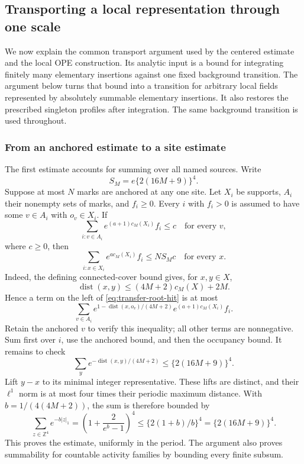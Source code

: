 \subsection{Transporting a local representation through one scale}
\label{sec:local-transfer}
We now explain the common transport argument used by the centered
estimate and the local OPE construction. Its analytic input is a
bound for integrating finitely many elementary insertions against
one fixed background transition. The argument below turns that
bound into a transition for arbitrary local fields represented by
absolutely summable elementary insertions. It also restores the
prescribed singleton profiles after integration. The same background
transition is used throughout.

\subsubsection{From an anchored estimate to a site estimate}
The first estimate accounts for summing over all named sources.
Write
\[
             S_M=e\{2(16M+9)\}^4.
\]
Suppose at most $N$ marks are anchored at any one site. Let
$X_i$ be supports, $A_i$ their nonempty sets of marks, and
$f_i\ge0$. Every $i$ with $f_i>0$ is assumed to have some
$v\in A_i$ with $o_v\in X_i$. If
\[
       \sum_{i:v\in A_i}e^{(a+1)c_M(X_i)}f_i\le c
                         \quad\text{for every }v,
\]
where $c\ge0$, then
\begin{equation}\label{eq:transfer-root-hit}
       \sum_{i:x\in X_i}e^{a c_M(X_i)}f_i\le NS_Mc
                         \quad\text{for every }x.
\end{equation}
Indeed, the defining connected-cover bound gives, for $x,y\in X$,
\[
       \operatorname{dist}(x,y)\le(4M+2)c_M(X)+2M.
\]
Hence a term on the left of \eqref{eq:transfer-root-hit} is at most
\[
 \sum_{v\in A_i}
 e^{1-\operatorname{dist}(x,o_v)/(4M+2)}
                         e^{(a+1)c_M(X_i)}f_i.
\]
Retain the anchored $v$ to verify this inequality; all other terms
are nonnegative. Sum first over $i$, use the anchored bound, and
then the occupancy bound. It remains to check
\[
 \sum_y e^{-\operatorname{dist}(x,y)/(4M+2)}
                  \le\{2(16M+9)\}^4.
\]
Lift $y-x$ to its minimal integer representative. These lifts are
distinct, and their $\ell^1$ norm is at most four times their
periodic maximum distance. With $b=1/(4(4M+2))$, the sum is
therefore bounded by
\[
 \sum_{z\in\mathbb Z^4}e^{-b|z|_1}
 =\left(1+\frac2{e^b-1}\right)^4
 \le\{2(1+b)/b\}^4=\{2(16M+9)\}^4.
\]
This proves the estimate, uniformly in the period. The argument
also proves summability for countable activity families by bounding
every finite subsum.

